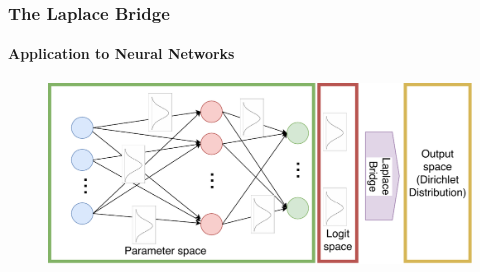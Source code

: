 \documentclass[10pt,usepdftitle=false,aspectratio=169,handout]{beamer}
\begin{document}

\begin{frame}\frametitle{The Laplace Bridge}
	\framesubtitle{Application to Neural Networks}
	\begin{figure}
		\includegraphics[width=\textwidth]{../figures/GaussNN_LaplaceBridge.pdf}
	\end{figure}
\end{frame}

\end{document}

